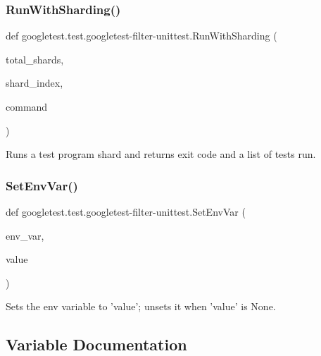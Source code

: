 \subsubsection{\texorpdfstring{RunWithSharding()}{RunWithSharding()}}
{\footnotesize\ttfamily def googletest.\+test.\+googletest-\/filter-\/unittest.\+Run\+With\+Sharding (\begin{DoxyParamCaption}\item[{}]{total\+\_\+shards,  }\item[{}]{shard\+\_\+index,  }\item[{}]{command }\end{DoxyParamCaption})}

\begin{DoxyVerb}Runs a test program shard and returns exit code and a list of tests run.\end{DoxyVerb}
 \mbox{\label{namespacegoogletest_1_1test_1_1googletest-filter-unittest_ab1f9b08e84805d31be99e2062bf33d12}} 
\subsubsection{\texorpdfstring{SetEnvVar()}{SetEnvVar()}}
{\footnotesize\ttfamily def googletest.\+test.\+googletest-\/filter-\/unittest.\+Set\+Env\+Var (\begin{DoxyParamCaption}\item[{}]{env\+\_\+var,  }\item[{}]{value }\end{DoxyParamCaption})}

\begin{DoxyVerb}Sets the env variable to 'value'; unsets it when 'value' is None.\end{DoxyVerb}
 

\subsection{Variable Documentation}
\mbox{\label{namespacegoogletest_1_1test_1_1googletest-filter-unittest_a8e4bb4e5c92ca7a573dfb28c2e9024a9}} 
